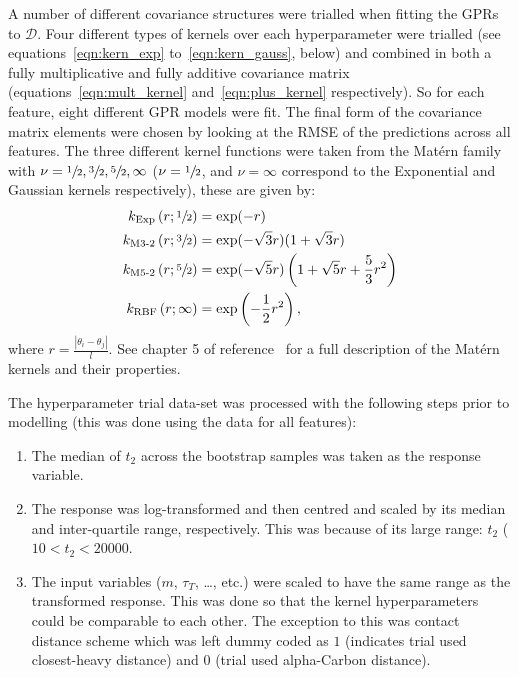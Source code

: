 \documentclass[journal=jacsat,manuscript=article]{achemso}
\begin{document}
A number of different covariance structures were trialled when fitting the GPRs to $\mathcal{D}$. Four different types of kernels over each hyperparameter were trialled (see equations~\ref{eqn:kern_exp} to~\ref{eqn:kern_gauss}, below) and combined in both a fully multiplicative and fully additive covariance matrix (equations~\ref{eqn:mult_kernel} and~\ref{eqn:plus_kernel} respectively).  So for each feature, eight different GPR models were fit. The final form of the covariance matrix elements were chosen by looking at the RMSE of the predictions across all features. The three different kernel functions were taken from the Mat\'ern family with $\nu=\sfrac{1}{2}, \sfrac{3}{2}, \sfrac{5}{2}, \infty$ ($\nu=\sfrac{1}{2}$, and $\nu=\infty$ correspond to the Exponential and Gaussian kernels respectively), these are given by: 
\begin{align}
k_{\text{Exp}}\left(r; \sfrac{1}{2}\right) &=\exp (-r) \label{eqn:kern_exp}\\
k_{\text{M3-2}}\left(r; \sfrac{3}{2}\right) &= \exp (-\sqrt{3} r)(1+\sqrt{3} r) \label{eqn:kern_m32} \\
k_{\text{M5-2}}\left(r; \sfrac{5}{2}\right) &= \exp (-\sqrt{5} r)\left(1+\sqrt{5} r+\frac{5}{3} r^{2}\right) \label{eqn:kern_m52}\\
k_{\text{RBF}}\left(r; \infty\right) &= \exp \left(-\frac{1}{2} r^{2}\right), \label{eqn:kern_gauss}
\end{align}
where $r = \frac{|\theta_i-\theta_j|}{l}$. See chapter 5 of  reference~\cite{rasmussenGaussianProcessesMachine2006} for a full description of the Mat\'{e}rn kernels and their properties.  

The hyperparameter trial data-set was processed with the following steps prior to modelling (this was done using the data for all features):
\begin{enumerate}
    \item The median of $t_2$ across the bootstrap samples was taken as the response variable. 
    \item The response  was log-transformed and then centred and scaled by its median and inter-quartile range, respectively. This was because of its large range: $t_2$ ($10 < t_2 < \num{20000}$. 
    \item The input variables ($m$, $\tau_{T}$, \ldots, etc.) were scaled to have the same range as the transformed response. This was done so that the kernel hyperparameters could be comparable to each other. The exception to this was contact distance scheme which was left dummy coded as $1$ (indicates trial used closest-heavy distance) and $0$ (trial used alpha-Carbon distance). 
\end{enumerate}
\end{document}
